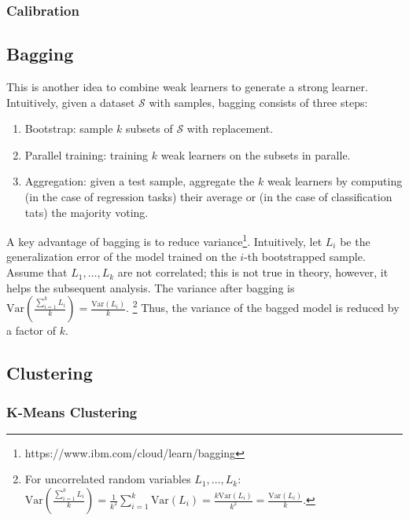 {    \subsubsection{Calibration}
        
        
    
    
    
\subsection{Bagging}

This is another idea to combine weak learners to generate a strong learner. 
Intuitively, given a dataset $\mathcal{S}$ with \ndata samples, bagging consists of three steps:
    \begin{enumerate}
        \item Bootstrap: sample $k$ subsets of $\mathcal{S}$ with replacement. 
        \item Parallel training: training $k$ weak learners on the subsets in paralle. 
        \item Aggregation: given a test sample, aggregate the $k$ weak learners by computing (in the case of regression tasks) their average or (in the case of classification tats) the majority voting.
    \end{enumerate}
A key advantage of bagging is to reduce variance\footnote{https://www.ibm.com/cloud/learn/bagging}.
Intuitively, let $L_i$ be the generalization error of the model trained on the $i$-th bootstrapped sample.
Assume that $L_1, \ldots, L_k$ are not correlated; this is not true in theory, however, it helps the subsequent analysis.
The variance after bagging is $\text{Var}\left(\frac{\sum_{i=1}^{k}{L_i}}{k}\right) = \frac{\text{Var}(L_i)}{k}$.
\footnote{For uncorrelated random variables $L_1, \ldots, L_k$: $\text{Var}\left(\frac{\sum_{i=1}^{k}{L_i}}{k}\right) = \frac{1}{k^2} \sum_{i=1}^{k}{\text{Var}(L_i)} = \frac{k \text{Var}(L_i)}{k^2} =  \frac{ \text{Var}(L_i)}{k}$.}
Thus, the variance of the bagged model is reduced by a factor of $k$.



\subsection{Clustering}
    \subsubsection{K-Means Clustering}
        \begin{itemize}
             

\end{itemize}}
